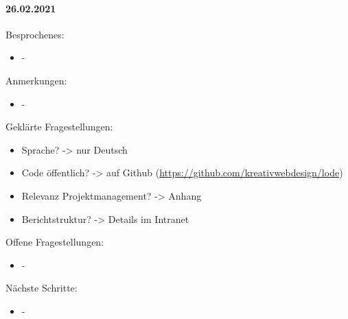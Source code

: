 \paragraph{26.02.2021}
Besprochenes:
\begin{itemize}
  \item -
\end{itemize}
Anmerkungen:
\begin{itemize}
  \item -
\end{itemize}
Geklärte Fragestellungen:
\begin{itemize}
  \item Sprache? -> nur Deutsch
  \item Code öffentlich? -> auf Github (\url{https://github.com/kreativwebdesign/lode})
  \item Relevanz Projektmanagement? -> Anhang
  \item Berichtstruktur? -> Details im Intranet
\end{itemize}
Offene Fragestellungen:
\begin{itemize}
  \item -
\end{itemize}
Nächste Schritte:
\begin{itemize}
  \item -
\end{itemize}
